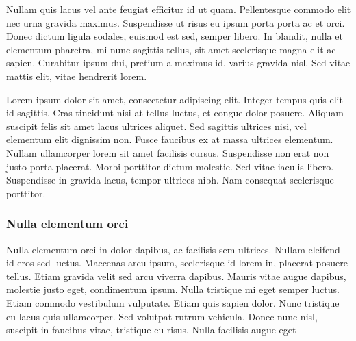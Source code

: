 Nullam quis lacus vel ante feugiat efficitur id ut quam. Pellentesque commodo elit nec urna gravida maximus. Suspendisse ut risus eu ipsum porta porta ac et orci. Donec dictum ligula sodales, euismod est sed, semper libero. In blandit, nulla et elementum pharetra, mi nunc sagittis tellus, sit amet scelerisque magna elit ac sapien. Curabitur ipsum dui, pretium a maximus id, varius gravida nisl. Sed vitae mattis elit, vitae hendrerit lorem.

Lorem ipsum dolor sit amet, consectetur adipiscing elit. Integer tempus quis elit id sagittis. Cras tincidunt nisi at tellus luctus, et congue dolor posuere. Aliquam suscipit felis sit amet lacus ultrices aliquet. Sed sagittis ultrices nisi, vel elementum elit dignissim non. Fusce faucibus ex at massa ultrices elementum. Nullam ullamcorper lorem sit amet facilisis cursus. Suspendisse non erat non justo porta placerat. Morbi porttitor dictum molestie. Sed vitae iaculis libero. Suspendisse in gravida lacus, tempor ultrices nibh. Nam consequat scelerisque porttitor.

\subsubsection{Nulla elementum orci}

Nulla elementum orci in dolor dapibus, ac facilisis sem ultrices. Nullam eleifend id eros sed luctus. Maecenas arcu ipsum, scelerisque id lorem in, placerat posuere tellus. Etiam gravida velit sed arcu viverra dapibus. Mauris vitae augue dapibus, molestie justo eget, condimentum ipsum. Nulla tristique mi eget semper luctus. Etiam commodo vestibulum vulputate. Etiam quis sapien dolor. Nunc tristique eu lacus quis ullamcorper. Sed volutpat rutrum vehicula. Donec nunc nisl, suscipit in faucibus vitae, tristique eu risus. Nulla facilisis augue eget